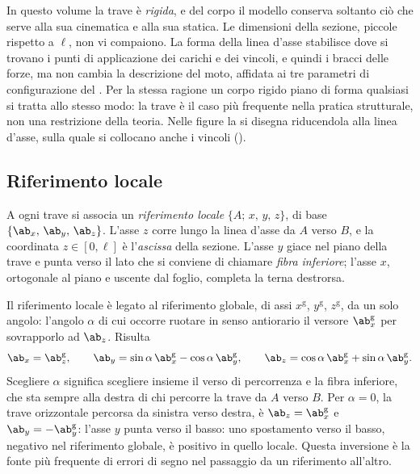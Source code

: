 In questo volume la trave è
\emph{rigida}, e del corpo
il modello conserva soltanto ciò che serve alla sua
cinematica e alla sua statica. Le dimensioni della
sezione, piccole rispetto a $\ell$, non vi compaiono.
La forma della linea d'asse stabilisce dove si trovano i
punti di applicazione dei carichi e dei vincoli, e quindi
i bracci delle forze, ma non cambia la descrizione del
moto, affidata ai tre parametri di configurazione del
. Per la stessa ragione un corpo
rigido piano di forma qualsiasi si tratta allo stesso
modo: la trave è il caso più frequente nella pratica
strutturale, non una restrizione della teoria. Nelle
figure la si disegna riducendola alla linea d'asse, sulla
quale si collocano anche i vincoli
().





\subsection{Riferimento locale}
\label{sec:riferimento_intrinseco}

A ogni trave si associa un \emph{riferimento
	locale}
$\{A;\,x,\,y,\,z\}$, di base
$\{\ab_x,\,\ab_y,\,\ab_z\}$.
L'asse $z$ corre lungo la linea d'asse da $A$ verso $B$,
e la coordinata $z \in [0,\ell]$ è l'\emph{ascissa}
della sezione. L'asse $y$ giace nel piano della trave e
punta verso il lato che si conviene di chiamare
\emph{fibra inferiore}; l'asse
$x$, ortogonale al piano e uscente dal foglio, completa
la terna destrorsa.

Il riferimento locale è legato al riferimento globale,
di assi $x^{\mathrm{g}}$, $y^{\mathrm{g}}$, $z^{\mathrm{g}}$,
da un solo angolo: l'angolo $\alpha$ di cui occorre
ruotare in senso antiorario il versore
$\ab_x^{\mathrm{g}}$ per sovrapporlo ad $\ab_z$. Risulta
\begin{equation}\label{eq:base_locale}
	\ab_x = \ab_z^{\mathrm{g}}, \qquad
	\ab_y = \sin\alpha\,\ab_x^{\mathrm{g}} - \cos\alpha\,\ab_y^{\mathrm{g}}, \qquad
	\ab_z = \cos\alpha\,\ab_x^{\mathrm{g}} + \sin\alpha\,\ab_y^{\mathrm{g}}.
\end{equation}
Scegliere $\alpha$ significa scegliere insieme il verso
di percorrenza e la fibra inferiore, che sta sempre alla
destra di chi percorre la trave da $A$ verso $B$. Per
$\alpha = 0$, la trave orizzontale percorsa da sinistra
verso destra, è $\ab_z = \ab_x^{\mathrm{g}}$ e
$\ab_y = -\ab_y^{\mathrm{g}}$: l'asse $y$ punta verso il
basso: uno spostamento verso il basso, negativo nel
riferimento globale, è positivo in quello locale. Questa
inversione è la fonte più frequente di errori di segno
nel passaggio da un riferimento all'altro.

